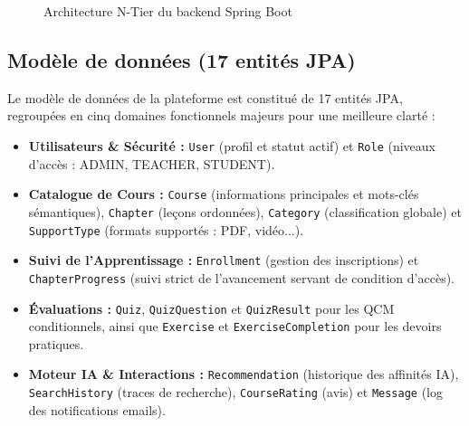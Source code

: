 \documentclass[12pt,a4paper]{report}
\begin{document}
\begin{figure}[H]
\centering
{}
\caption{Architecture N-Tier du backend Spring Boot}
\label{fig:ntier}
\end{figure}

\subsection{Modèle de données (17 entités JPA)}

Le modèle de données de la plateforme est constitué de 17 entités JPA, regroupées en cinq domaines fonctionnels majeurs pour une meilleure clarté :

\begin{itemize}[leftmargin=*]
  \item \textbf{Utilisateurs \& Sécurité :} \texttt{User} (profil et statut actif) et \texttt{Role} (niveaux d'accès : ADMIN, TEACHER, STUDENT).
  \item \textbf{Catalogue de Cours :} \texttt{Course} (informations principales et mots-clés sémantiques), \texttt{Chapter} (leçons ordonnées), \texttt{Category} (classification globale) et \texttt{SupportType} (formats supportés : PDF, vidéo...).
  \item \textbf{Suivi de l'Apprentissage :} \texttt{Enrollment} (gestion des inscriptions) et \texttt{ChapterProgress} (suivi strict de l'avancement servant de condition d'accès).
  \item \textbf{Évaluations :} \texttt{Quiz}, \texttt{QuizQuestion} et \texttt{QuizResult} pour les QCM conditionnels, ainsi que \texttt{Exercise} et \texttt{ExerciseCompletion} pour les devoirs pratiques.
  \item \textbf{Moteur IA \& Interactions :} \texttt{Recommendation} (historique des affinités IA), \texttt{SearchHistory} (traces de recherche), \texttt{CourseRating} (avis) et \texttt{Message} (log des notifications emails).
\end{itemize}
\end{document}
